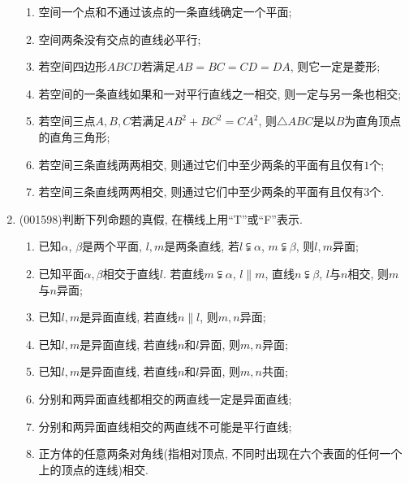 \documentclass[10pt,a4paper]{article}
\newcommand{\blank}[1]{\underline{\hbox to #1pt{}}}
\begin{document}
\begin{enumerate}[1.]
\begin{enumerate}[\blank{30}(1)]
\item 空间一个点和不通过该点的一条直线确定一个平面;\\ 
\item 空间两条没有交点的直线必平行;\\ 
\item 若空间四边形$ABCD$若满足$AB=BC=CD=DA$, 则它一定是菱形;\\ 
\item 若空间的一条直线如果和一对平行直线之一相交, 则一定与另一条也相交;\\ 
\item 若空间三点$A,B,C$若满足$AB^2+BC^2=CA^2$, 则$\triangle ABC$是以$B$为直角顶点的直角三角形;\\ 
\item 若空间三条直线两两相交, 则通过它们中至少两条的平面有且仅有$1$个;\\ 
\item 若空间三条直线两两相交, 则通过它们中至少两条的平面有且仅有$3$个.\\ 
\end{enumerate}
\item {\tiny (001598)}判断下列命题的真假, 在横线上用``T''或``F''表示.
\begin{enumerate}[\blank{30}(1)]
\item 已知$\alpha$, $\beta$是两个平面, $l,m$是两条直线, 若$l\subsetneqq \alpha$, $m\subsetneqq \beta$, 则$l,m$异面;\\ 
\item 已知平面$\alpha,\beta$相交于直线$l$. 若直线$m\subsetneqq \alpha$, $l \parallel m$, 直线$n\subsetneqq \beta$, $l$与$n$相交, 则$m$与$n$异面;\\ 
\item 已知$l,m$是异面直线, 若直线$n\parallel l$, 则$m,n$异面;\\ 
\item 已知$l,m$是异面直线, 若直线$n$和$l$异面, 则$m,n$异面;\\ 
\item 已知$l,m$是异面直线, 若直线$n$和$l$异面, 则$m,n$共面;\\ 
\item 分别和两异面直线都相交的两直线一定是异面直线;\\ 
\item 分别和两异面直线相交的两直线不可能是平行直线;\\ 
\item 正方体的任意两条对角线(指相对顶点, 不同时出现在六个表面的任何一个上的顶点的连线)相交.\\ 
\end{enumerate}

\end{enumerate}
\end{document}

